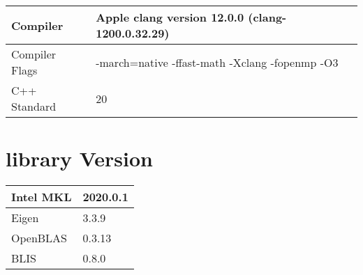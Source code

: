 \begin{tabular}{|l | l|}
    \hline
    Compiler & Apple clang version 12.0.0 (clang-1200.0.32.29) \\
    \hline
    Compiler Flags & -march=native -ffast-math -Xclang -fopenmp -O3 \\
    \hline
    C++ Standard & 20 \\
    \hline
\end{tabular}

\section{library Version}

\begin{tabular}{|l | l|}
    \hline
    Intel MKL & 2020.0.1 \\
    \hline
    Eigen & 3.3.9 \\
    \hline
    OpenBLAS & 0.3.13 \\
    \hline
    BLIS & 0.8.0 \\
    \hline
\end{tabular}